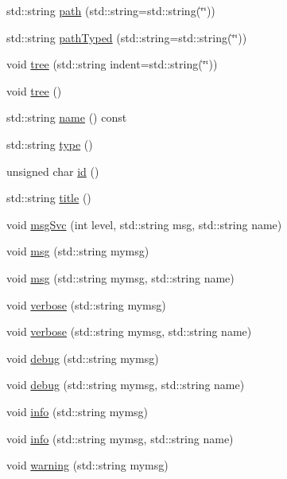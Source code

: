 \begin{DoxyCompactItemize}
\item 
std::string \hyperlink{classHierarchy_aa7990fa7caf132d83e361ce033c6c65a}{path} (std::string=std::string(\char`\"{}\char`\"{}))
\item 
std::string \hyperlink{classHierarchy_a1efd56cd164d328d2002e53a10a19b8c}{pathTyped} (std::string=std::string(\char`\"{}\char`\"{}))
\item 
void \hyperlink{classHierarchy_a76e914b9a677a22a82deb74d892bf261}{tree} (std::string indent=std::string(\char`\"{}\char`\"{}))
\item 
void \hyperlink{classHierarchy_a594c294c5f60c230e106d522ed008212}{tree} ()
\item 
std::string \hyperlink{classObject_a975e888d50bfcbffda2c86368332a5cd}{name} () const 
\item 
std::string \hyperlink{classObject_a84f99f70f144a83e1582d1d0f84e4e62}{type} ()
\item 
unsigned char \hyperlink{classObject_af99145335cc61ff6e2798ea17db009d2}{id} ()
\item 
std::string \hyperlink{classObject_a73a0f1a41828fdd8303dd662446fb6c3}{title} ()
\item 
void \hyperlink{classObject_a3f9d5537ebce0c0f2bf6ae4d92426f3c}{msgSvc} (int level, std::string msg, std::string name)
\item 
void \hyperlink{classObject_a58b2d0618c2d08cf2383012611528d97}{msg} (std::string mymsg)
\item 
void \hyperlink{classObject_ac5d59299273cee27aacf7de00d2e7034}{msg} (std::string mymsg, std::string name)
\item 
void \hyperlink{classObject_a83d2db2df682907ea1115ad721c1c4a1}{verbose} (std::string mymsg)
\item 
void \hyperlink{classObject_a2d4120195317e2a3c6532e8bb9f3da68}{verbose} (std::string mymsg, std::string name)
\item 
void \hyperlink{classObject_aac010553f022165573714b7014a15f0d}{debug} (std::string mymsg)
\item 
void \hyperlink{classObject_a6c9a0397ca804e04d675ed05683f5420}{debug} (std::string mymsg, std::string name)
\item 
void \hyperlink{classObject_a644fd329ea4cb85f54fa6846484b84a8}{info} (std::string mymsg)
\item 
void \hyperlink{classObject_a1ca123253dfd30fc28b156f521dcbdae}{info} (std::string mymsg, std::string name)
\item 
void \hyperlink{classObject_a65cd4fda577711660821fd2cd5a3b4c9}{warning} (std::string mymsg)

\end{DoxyCompactItemize}
